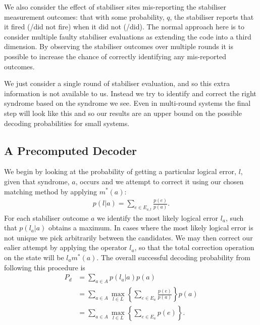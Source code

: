 We also consider the effect of stabiliser sites mis-reporting the stabiliser measurement outcomes: that with some probability, $q$, the stabiliser reports that it fired (/did not fire) when it did not (/did). The normal approach here is to consider multiple faulty stabiliser evaluations as extending the code into a third dimension. By observing the stabiliser outcomes over multiple rounds it is possible to increase the chance of correctly identifying any mis-reported outcomes.

We just consider a single round of stabiliser evaluation, and so this extra information is not available to us. Instead we try to identify and correct the right syndrome based on the syndrome we see. Even in multi-round systems the final step will look like this and so our results are an upper bound on the possible decoding probabilities for small systems.

\subsection{A Precomputed Decoder}

We begin by looking at the probability of getting a particular logical error, $l$, given that syndrome, $a$, occurs and we attempt to correct it using our chosen matching method by applying $m^*(a)$:
\begin{align}
  p(l \vert a) = \sum_{e \in E_{a,l}} \frac{p(e)}{p(a)}. 
\end{align}
For each stabiliser outcome $a$ we identify the most likely logical error $l_a$, such that $p(l_a \vert a)$ obtains a maximum. In cases where the most likely logical error is not unique we pick arbitrarily between the candidates. We may then correct our ealier attempt by applying the operator $l_a$, so that the total correction operation on the state will be $l_am^*(a)$. The overall successful decoding probability from following this procedure is 
\begin{align}
  P_d &= \sum_{a \in A} p(l_a \vert a)p(a) \\
  &= \sum_{a \in A} \max_{l\in L} \left\{ \sum_{e \in E_a} \frac{p(e)}{p(a)} \right\} p(a) \\
  &= \sum_{a \in A} \max_{l\in L} \left\{ \sum_{e \in E_a} p(e) \right\}. \label{truthful_prob}
\end{align}

